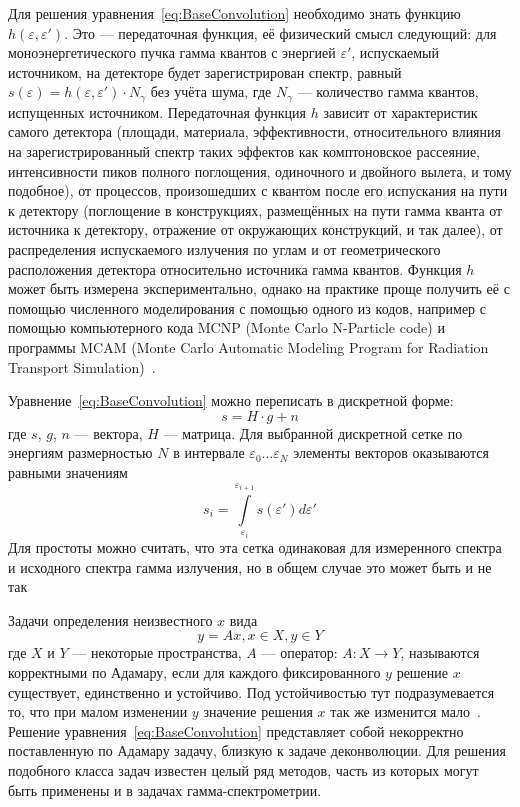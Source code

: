Для решения уравнения~\ref{eq:BaseConvolution} необходимо знать функцию $ h( \varepsilon, \varepsilon' ) $. Это --- передаточная функция, её физический смысл следующий: для моноэнергетического пучка гамма квантов с энергией $\varepsilon'$, испускаемый источником, на детекторе будет зарегистрирован спектр, равный $s(\varepsilon) = h(\varepsilon, \varepsilon') \cdot N_{\gamma}$ без учёта шума, где $N_{\gamma}$ --- количество гамма квантов, испущенных источником. Передаточная функция $h$ зависит от характеристик самого детектора (площади, материала, эффективности, относительного влияния на зарегистрированный спектр таких эффектов как комптоновское рассеяние, интенсивности пиков полного поглощения, одиночного и двойного вылета, и тому подобное), от процессов, произошедших с квантом после его испускания на пути к детектору (поглощение в конструкциях, размещённых на пути гамма кванта от источника к детектору, отражение от окружающих конструкций, и так далее), от распределения испускаемого излучения по углам и от геометрического расположения детектора относительно источника гамма квантов. Функция $h$ может быть измерена экспериментально, однако на практике проще получить её с помощью численного моделирования с помощью одного из кодов, например с помощью компьютерного кода MCNP (Monte Carlo N-Particle code) и программы MCAM (Monte Carlo Automatic Modeling Program for Radiation Transport Simulation)~\cite{Hendricks2004,Fischer2005,Wu2009,Forster2004}.

Уравнение~\ref{eq:BaseConvolution} можно переписать в дискретной форме:
\begin{equation}
  \label{eq:BaseConvolutionMatrix}
  s = H \cdot g + n 
\end{equation}
где $s$, $g$, $n$ --- вектора, $H$ --- матрица. Для выбранной дискретной сетке по энергиям размерностью $N$ в интервале $ \varepsilon_0 \ldots \varepsilon_N $ элементы векторов оказываются равными значениям
\begin{equation*}
  s_i = \int \limits_{\varepsilon_i}^{\varepsilon_{i+1}} s( \varepsilon' ) d \varepsilon'
\end{equation*}
Для простоты можно считать, что эта сетка одинаковая для измеренного спектра и исходного спектра гамма излучения, но в общем случае это может быть и не так

Задачи определения неизвестного $x$ вида 
\begin{equation*}
  y = A x, x \in X, y \in Y
\end{equation*}
где $X$ и $Y$ --- некоторые пространства, $A$ --- оператор: $ A : X \rightarrow Y $, называются корректными по Адамару, если для каждого фиксированного $y$ решение $x$ существует, единственно и устойчиво. Под устойчивостью тут подразумевается то, что при малом изменении $y$ значение решения $x$ так же изменится мало~\cite{Liskovets1982}. Решение уравнения~\ref{eq:BaseConvolution} представляет собой некорректно поставленную по Адамару задачу, близкую к задаче деконволюции. Для решения подобного класса задач известен целый ряд методов, часть из которых могут быть применены и в задачах гамма-спектрометрии.


